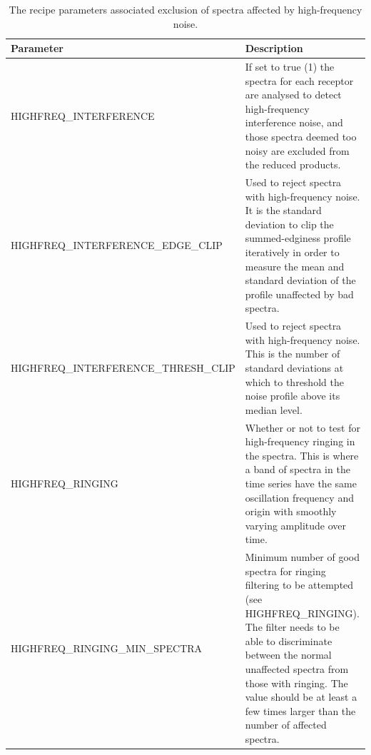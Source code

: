 \documentclass[11pt,oneside,chapters]{starlink}
\begin{document}
\begin{table}[h!]
\begin{small}
\begin{tabular}{|p{6.8cm}|p{8.6cm}|}
\hline
\textbf{Parameter} & \textbf{Description} \\
\hline
HIGHFREQ\_INTERFERENCE & If set to true (1) the spectra for each receptor are analysed to
                         detect high-frequency interference noise, and those spectra deemed
                         too noisy are excluded from the reduced products.\\
HIGHFREQ\_INTERFERENCE\_EDGE\_CLIP & Used to reject spectra with high-frequency noise.  It
                                     is the standard deviation to clip the summed-edginess
                                     profile iteratively in order to measure the mean and
                                     standard deviation of the profile unaffected by bad
                                     spectra.\\
HIGHFREQ\_INTERFERENCE\_THRESH\_CLIP & Used to reject spectra with high-frequency noise.
                                       This is the number of standard deviations at which
                                       to threshold the noise profile above its median level.\\
HIGHFREQ\_RINGING & Whether or not to test for high-frequency ringing in the spectra. This
                    is where a band of spectra in the time series have the same oscillation
                    frequency and origin with smoothly varying amplitude over time.\\
HIGHFREQ\_RINGING\_MIN\_SPECTRA & Minimum number of good spectra for ringing filtering to
                                  be attempted (see HIGHFREQ\_RINGING).  The filter needs
                                  to be able to discriminate between the normal unaffected
                                  spectra from those with ringing.  The value should be at
                                  least a few times larger than the number of affected
                                  spectra.\\
\hline
\end{tabular}
\end{small}
\caption{\label{tab:hfi_params}
  The recipe parameters associated exclusion of spectra affected by high-frequency
  noise.}
\end{table}
\end{document}
